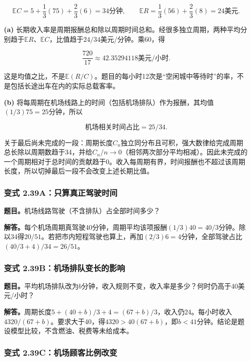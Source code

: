 \documentclass[12pt,a4paper,UTF8,fontset=fandol]{ctexart}
\begin{document}
\[
\mathbb EC=5+\frac13(75)+\frac23(6)=34\text{分钟},\qquad
\mathbb ER=\frac13(56)+\frac23(8)=24\text{美元}.
\]

\textbf{(a)}
长期收入率是周期报酬总和除以周期时间总和。经很多独立周期，两种平均分别趋于\(\mathbb ER\)、\(\mathbb EC\)，比值趋于\(24/34\)美元/分钟。乘60，得

\[\boxed{\frac{720}{17}\approx42.35294118\text{美元/小时}.}\]

这是均值之比，不是\(\mathbb E(R/C)\)。题目的每小时12次是``空闲城中等待时''的率，不是包括长途出车在内的实际总载客率。

\textbf{(b)}
将每周期在机场线路上的时间（包括机场排队）作为报酬，其均值\((1/3)75=25\)分钟，所以

\[\boxed{\text{机场相关时间占比}=25/34.}\]

关于最后尚未完成的一段：周期长度\(C_n\)独立同分布且可积，强大数律给完成周期总长除以周期数趋于34，并给\(C_n/n\to0\)（相邻两次部分平均相减）。因此未完成的一个周期相对于总时间的贡献趋于0。收入每周期有界，时间报酬也不超过该周期长度，所以切掉最后一段不会改变上述长期比值。

\subsubsection{变式
2.39A：只算真正驾驶时间}\label{ux53d8ux5f0f-2.39aux53eaux7b97ux771fux6b63ux9a7eux9a76ux65f6ux95f4}

\textbf{题目。}机场线路驾驶（不含排队）占全部时间多少？

\textbf{解答。}每个机场周期真驾驶40分钟，周期平均该项报酬\((1/3)40=40/3\)分钟。除以34得\(\boxed{20/51}\)。若把市内短程驾驶也算上，再加\((2/3)6=4\)分钟，全部驾驶占比\((40/3+4)/34=26/51\)。

\subsubsection{变式
2.39B：机场排队变长的影响}\label{ux53d8ux5f0f-2.39bux673aux573aux6392ux961fux53d8ux957fux7684ux5f71ux54cd}

\textbf{题目。}平均机场排队改为\(b\)分钟，收入规则不变，收入率是多少？何时仍高于40美元/小时？

\textbf{解答。}周期长度\(5+(40+b)/3+4=(67+b)/3\)，收入仍24。每小时收入\(4320/(67+b)\)。要求大于40，得\(4320>40(67+b)\)，即\(b<41\)分钟。结论是题设模型比较，不含燃油、税费等未给成本。

\subsubsection{变式
2.39C：机场顾客比例改变}\label{ux53d8ux5f0f-2.39cux673aux573aux987eux5ba2ux6bd4ux4f8bux6539ux53d8}
\end{document}
